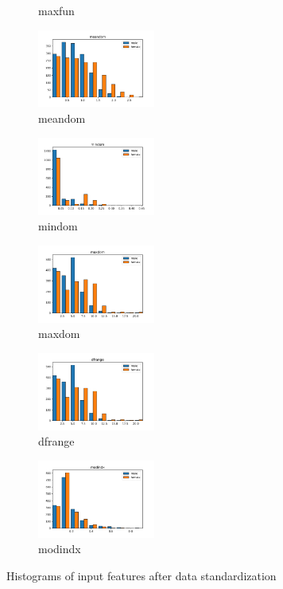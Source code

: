 \documentclass[a4paper]{article}    %
\begin{document}
\begin{figure}[H]
\begin{subfigure}{0.32\textwidth}
        \caption{maxfun}
        \label{fig:sub_sbs_14}
    \end{subfigure}\hfill
    \begin{subfigure}{0.32\textwidth}
        \centering
        \includegraphics[width=3.85cm]{sbs_14_meandom}
        \caption{meandom}
        \label{fig:sub_sbs_15}
    \end{subfigure}\hfill
    \begin{subfigure}{0.32\textwidth}
        \centering
        \includegraphics[width=3.85cm]{sbs_15_mindom}
        \caption{mindom}
        \label{fig:sub_sbs_16}
    \end{subfigure}\hfill
    \begin{subfigure}{0.32\textwidth}
        \centering
        \includegraphics[width=3.85cm]{sbs_16_maxdom}
        \caption{maxdom}
        \label{fig:sub_sbs_17}
    \end{subfigure}\hfill
    \begin{subfigure}{0.32\textwidth}
        \centering
        \includegraphics[width=3.85cm]{sbs_17_dfrange}
        \caption{dfrange}
        \label{fig:sub_sbs_18}
    \end{subfigure}\hfill
    \begin{subfigure}{0.32\textwidth}
        \centering
        \includegraphics[width=3.85cm]{sbs_18_modindx}
        \caption{modindx}
        \label{fig:sub_sbs_19}
    \end{subfigure}
    \caption{Histograms of input features after data standardization}
    \label{fig:pre-ex1-sbs_histograms}
\end{figure}
\end{document}
